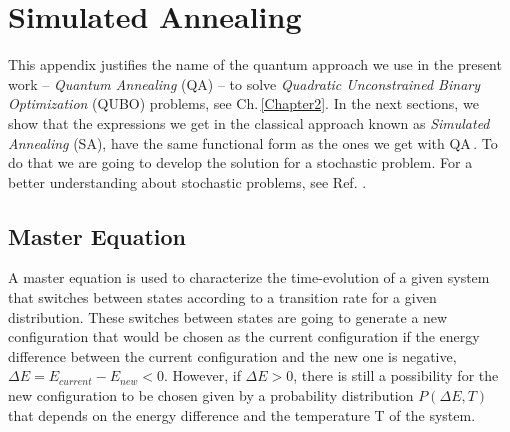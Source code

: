 
\chapter{Simulated Annealing} %

This appendix justifies the name of the quantum approach we use in the present work -- \textit{Quantum Annealing} (QA) -- to solve \textit{Quadratic Unconstrained Binary Optimization} (QUBO) problems, see Ch.\,\ref{Chapter2}. In the next sections, we show that the expressions we get in the classical approach known as \textit{Simulated Annealing} (SA), have the same functional form as the ones we get with QA\,\cite{Kadowaki1998QuantumModel}. To do that we are going to develop the solution for a stochastic problem. For a better understanding about stochastic problems, see Ref. \cite{Schneider2006StochasticOptimization}. 
\label{AppendixB} %
\section{Master Equation}
A master equation is used to characterize the time-evolution of a given system that switches between states according to a transition rate for a given distribution. These switches between states are going to generate a new configuration that would be chosen as the current configuration if the energy difference between the current configuration and the new one is negative, $\Delta E = E_{current} - E_{new} < 0$. However, if $\Delta E > 0$, there is still a possibility for the new configuration to be chosen given by a probability distribution $P \left(\Delta E, T \right)$ that depends on the energy difference and the temperature T of the system.
